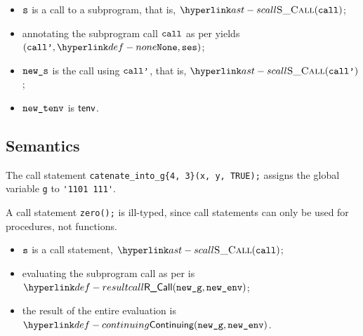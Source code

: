 \ProseParagraph
\AllApply
\begin{itemize}
  \item $\vs$ is a call to a subprogram, that is, $\SCall(\vcall)$;
  \item annotating the subprogram call $\vcall$ as per 
        yields \\
        $(\vcallp, \None, \vses)$\ProseOrTypeError;
  \item $\news$ is the call using $\vcallp$, that is, $\SCall(\vcallp)$;
  \item $\newtenv$ is $\tenv$.
\end{itemize}
\FormallyParagraph
\begin{mathpar}
\end{mathpar}

\subsection{Semantics}
The call statement \verb|catenate_into_g{4, 3}(x, y, TRUE);|
assigns the global variable \verb|g| to \verb|'1101 111'|.

A call statement \verb|zero();| is ill-typed, since call statements
can only be used for procedures, not functions.

\ProseParagraph
\AllApply
\begin{itemize}
  \item $\vs$ is a call statement, $\SCall(\vcall)$;
  \item evaluating the subprogram call as per  is
  \\ $\ResultCall(\newg, \newenv)$\ProseOrAbnormal;
  \item the result of the entire evaluation is $\Continuing(\newg, \newenv)$.
\end{itemize}

\FormallyParagraph
\begin{mathpar}
\end{mathpar}

